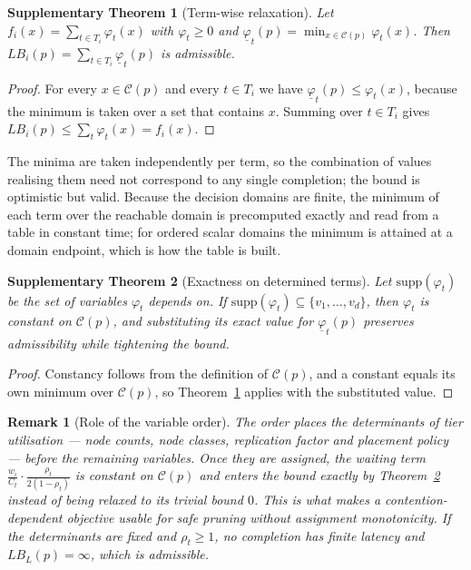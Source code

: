\documentclass[pdflatex,sn-nature]{sn-jnl}
\newcommand{\C}{\mathcal{C}}
\newcommand{\LB}{\mathit{LB}}
\theoremstyle{thmstyleone}
\newtheorem{theorem}{Supplementary Theorem}
\theoremstyle{thmstyletwo}
\newtheorem{remark}{Remark}
\theoremstyle{thmstylethree}
\begin{document}
\begin{theorem}[Term-wise relaxation]\label{sthm:relax}
Let $f_i(x)=\sum_{t\in T_i}\varphi_t(x)$ with $\varphi_t\ge0$ and
$\underline{\varphi}_t(p)=\min_{x\in\C(p)}\varphi_t(x)$. Then
$\LB_i(p)=\sum_{t\in T_i}\underline{\varphi}_t(p)$ is admissible.
\end{theorem}
\begin{proof}
For every $x\in\C(p)$ and every $t\in T_i$ we have
$\underline{\varphi}_t(p)\le\varphi_t(x)$, because the minimum is taken over a set that
contains $x$. Summing over $t\in T_i$ gives $\LB_i(p)\le\sum_t\varphi_t(x)=f_i(x)$.
\end{proof}

The minima are taken independently per term, so the combination of values realising them
need not correspond to any single completion; the bound is optimistic but valid. Because the
decision domains are finite, the minimum of each term over the reachable domain is
precomputed exactly and read from a table in constant time; for ordered scalar domains
the minimum is attained at a domain endpoint, which is how the table is built.

\begin{theorem}[Exactness on determined terms]\label{sthm:exact}
Let $\mathrm{supp}(\varphi_t)$ be the set of variables $\varphi_t$ depends on. If
$\mathrm{supp}(\varphi_t)\subseteq\{v_1,\dots,v_d\}$, then $\varphi_t$ is constant on
$\C(p)$, and substituting its exact value for $\underline{\varphi}_t(p)$ preserves
admissibility while tightening the bound.
\end{theorem}
\begin{proof}
Constancy follows from the definition of $\C(p)$, and a constant equals its own minimum
over $\C(p)$, so Theorem~\ref{sthm:relax} applies with the substituted value.
\end{proof}

\begin{remark}[Role of the variable order]
The order places the determinants of tier utilisation --- node counts, node classes,
replication factor and placement policy --- before the remaining variables. Once they are
assigned, the waiting term $\frac{w_i}{C_t}\cdot\frac{\rho_t}{2(1-\rho_t)}$ is constant
on $\C(p)$ and enters the bound exactly by Theorem~\ref{sthm:exact} instead of being
relaxed to its trivial bound $0$. This is what makes a contention-dependent objective
usable for safe pruning without assignment monotonicity. If the determinants are fixed
and $\rho_t\ge1$, no completion has finite latency and $\LB_L(p)=\infty$, which is
admissible.
\end{remark}
\end{document}
